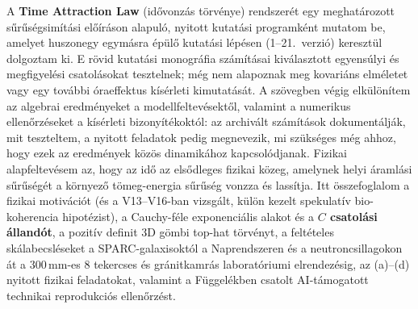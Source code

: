 \documentclass[10pt,a4paper]{article}
\begin{document}
{\small{}\par
A \textbf{Time Attraction Law} (id\H{o}vonz\'as t\"orv\'enye) rendszer\'et egy meghat\'arozott s\H{u}r\H{u}s\'egsim\'it\'asi el\H{o}\'ir\'ason alapul\'o, nyitott kutat\'asi programk\'ent mutatom be, amelyet huszonegy egym\'asra \'ep\"ul\H{o} kutat\'asi l\'ep\'esen (1--21.\ verzi\'o) kereszt\"ul dolgoztam ki. E r\"ovid kutat\'asi monogr\'afia sz\'am\'it\'asai kiv\'alasztott egyens\'ulyi \'es megfigyel\'esi csatol\'asokat tesztelnek; m\'eg nem alapoznak meg kovari\'ans elm\'eletet vagy egy tov\'abbi \'oraeffektus k\'is\'erleti kimutat\'as\'at. A sz\"ovegben v\'egig elk\"ul\"on\'item az algebrai eredm\'enyeket a modellfeltev\'esekt\H{o}l, valamint a numerikus ellen\H{o}rz\'eseket a k\'is\'erleti bizony\'it\'ekokt\'ol: az archiv\'alt sz\'am\'it\'asok dokument\'alj\'ak, mit teszteltem, a nyitott feladatok pedig megnevezik, mi sz\"uks\'eges m\'eg ahhoz, hogy ezek az eredm\'enyek k\"oz\"os dinamik\'ahoz kapcsol\'odjanak. Fizikai alapfeltev\'esem az, hogy az id\H{o} az els\H{o}dleges fizikai k\"ozeg, amelynek helyi \'araml\'asi s\H{u}r\H{u}s\'eg\'et a k\"ornyez\H{o} t\"omeg-energia s\H{u}r\H{u}s\'eg vonzza \'es lass\'itja. Itt \"osszefoglalom a fizikai motiv\'aci\'ot (\'es a V13--V16-ban vizsg\'alt, k\"ul\"on kezelt spekulat\'iv bio-koherencia hipot\'ezist), a Cauchy-f\'ele exponenci\'alis alakot \'es a \textbf{$C$ csatol\'asi \'alland\'ot}, a pozit\'iv definit 3D g\"ombi top-hat t\"orv\'enyt, a felt\'eteles sk\'alabecsl\'eseket a SPARC-galaxisokt\'ol a Naprendszeren \'es a neutroncsillagokon \'at a $300\,\text{mm}$-es 8 tekercses \'es gr\'anitkamr\'as laborat\'oriumi elrendez\'esig, az (a)--(d) nyitott fizikai feladatokat, valamint a F\"uggel\'ekben csatolt AI-t\'amogatott technikai reprodukci\'os ellen\H{o}rz\'est.

}
\end{document}
